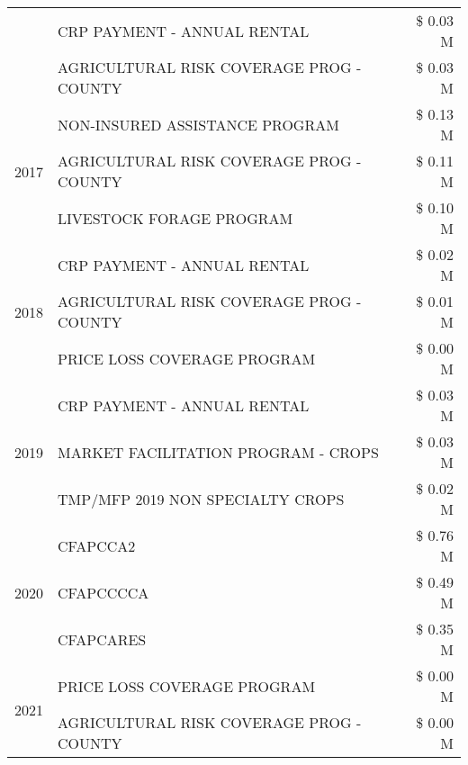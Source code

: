 \begin{tabular}{llr}
 & CRP PAYMENT - ANNUAL RENTAL                   & \$ 0.03 M \\
 & AGRICULTURAL RISK COVERAGE PROG - COUNTY      & \$ 0.03 M \\
\cline{1-3}
\multirow[t]{3}{*}{2017} & NON-INSURED ASSISTANCE PROGRAM & \$ 0.13 M \\
 & AGRICULTURAL RISK COVERAGE PROG - COUNTY & \$ 0.11 M \\
 & LIVESTOCK FORAGE PROGRAM & \$ 0.10 M \\
\cline{1-3}
\multirow[t]{3}{*}{2018} & CRP PAYMENT - ANNUAL RENTAL & \$ 0.02 M \\
 & AGRICULTURAL RISK COVERAGE PROG - COUNTY & \$ 0.01 M \\
 & PRICE LOSS COVERAGE PROGRAM & \$ 0.00 M \\
\cline{1-3}
\multirow[t]{3}{*}{2019} & CRP PAYMENT - ANNUAL RENTAL & \$ 0.03 M \\
 & MARKET FACILITATION PROGRAM - CROPS & \$ 0.03 M \\
 & TMP/MFP 2019 NON SPECIALTY CROPS & \$ 0.02 M \\
\cline{1-3}
\multirow[t]{3}{*}{2020} & CFAPCCA2 & \$ 0.76 M \\
 & CFAPCCCCA & \$ 0.49 M \\
 & CFAPCARES & \$ 0.35 M \\
\cline{1-3}
\multirow[t]{2}{*}{2021} & PRICE LOSS COVERAGE PROGRAM & \$ 0.00 M \\
 & AGRICULTURAL RISK COVERAGE PROG - COUNTY & \$ 0.00 M \\
\cline{1-3}
\bottomrule
\end{tabular}
